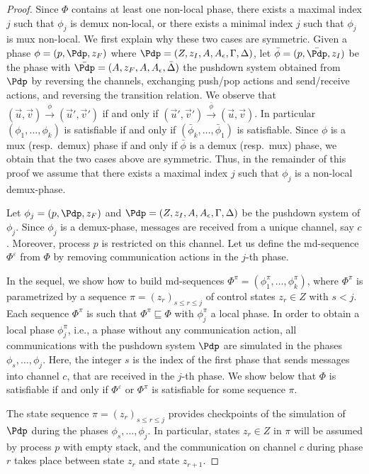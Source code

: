 \documentclass{LMCS}
\begin{document}
\begin{proof}
  Since $\Phi$ contains at least one non-local phase, there exists a
  maximal index $j$ such that $\phi_j$ is demux non-local, or there
  exists a minimal index $j$ such that $\phi_j$ is mux non-local. We
  first explain why these two cases are symmetric. Given a phase
  $\phi=(p,\Pdp,z_F)$ where $\Pdp=(Z,z_I,A,A_\epsilon,\Gamma,\Delta)$,
  let $\bar{\phi}=(p,\bar{\Pdp},z_I)$ be the phase with
  $\bar{\Pdp}=(A,z_F,A,A_\epsilon,\bar{\Delta})$ the pushdown system
  obtained from $\Pdp$ by reversing the channels, exchanging push/pop
  actions and send/receive actions, and reversing the transition
  relation. We observe that
  $(\vec{u},\vec{v})\xrightarrow{\phi}(\vec{u}',\vec{v}')$ if and only
  if
  $(\vec{u}',\vec{v}')\xrightarrow{\bar{\phi}}(\vec{u},\vec{v})$. In
  particular $(\phi_1,\ldots,\phi_k)$ is satisfiable if and only if
  $(\bar{\phi}_k,\ldots,\bar{\phi}_1)$ is satisfiable. Since $\phi$ is
  a mux (resp.~demux) phase if and only if $\bar{\phi}$ is a demux
  (resp.~mux) phase, we obtain that the two cases above are
  symmetric. Thus, in the remainder of this proof we assume that there
  exists a maximal index $j$ such that $\phi_j$ is a non-local
  demux-phase.


  Let $\phi_j=(p,\Pdp,z_F)$ and
  $\Pdp=(Z,z_I,A,A_\epsilon,\Gamma,\Delta)$ be the pushdown system of
  $\phi_j$. Since $\phi_j$ is a demux-phase, messages are received
  from a unique channel, say $c$. Moreover, process $p$ is restricted
  on this channel.  Let us define the md-sequence $\Phi^\varepsilon$ from $\Phi$
  by removing communication actions in the $j$-th phase.

  In the sequel, we show how to build md-sequences
  $\Phi^\pi=(\phi_1^\pi,\ldots,\phi_k^\pi)$, where $\Phi^\pi$ is
  parametrized by a sequence $\pi=(z_r)_{s\leq r\leq j}$ of control
  states $z_r\in Z$ with $s<j$. Each sequence $\Phi^\pi$ is such that
  $\Phi^\pi\sqsubseteq \Phi$ with $\phi_j^\pi$ a local
  phase. In order to obtain a local
  phase $\phi_j^\pi$, i.e., a phase without any communication action,
  all communications with the pushdown system $\Pdp$ are simulated in
  the phases $\phi_s,\ldots,\phi_j$. Here, the integer $s$ is the
  index of the first phase that sends messages into channel $c$, that
  are received in the $j$-th phase. We show below that $\Phi$ is
  satisfiable if and only if $\Phi^\varepsilon$ or $\Phi^\pi$
  is satisfiable for some sequence $\pi$.

 The state sequence $\pi=(z_r)_{s\leq
    r\leq j}$ provides checkpoints of the simulation of $\Pdp$ during the
  phases $\phi_s,\ldots,\phi_j$. In particular, states $z_r \in Z$
  in $\pi$ will be  
  assumed by process $p$ with empty stack, and the communication on
  channel $c$ during phase $r$ takes place between state $z_r$ and
  state $z_{r+1}$.


\end{proof}
\end{document}
